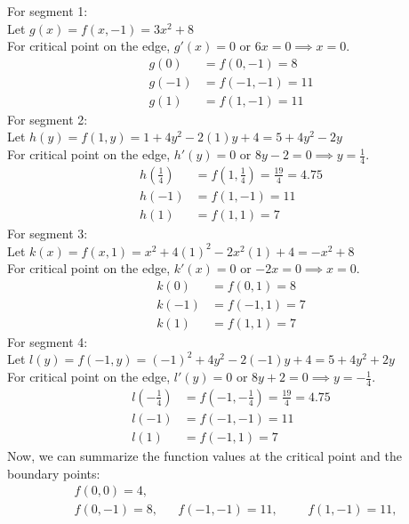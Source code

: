 {    For segment 1: \\
    Let $g(x)=f(x,-1)=3x^2+8$ \\
    For critical point on the edge, $g'(x)=0$ or $6x=0 \implies x=0$. \\
    \begin{align*}
        g(0) &= f(0,-1) = 8 \\
        g(-1) &= f(-1,-1) = 11 \\ 
        g(1) &= f(1,-1) = 11
    \end{align*}
    For segment 2: \\
    Let $h(y)=f(1,y)=1+4y^2-2(1)y+4=5+4y^2-2y$ \\ 
    For critical point on the edge, $h'(y)=0$ or $8y-2=0 \implies y=\frac{1}{4}$. \\ 
    \begin{align*}
        h\left(\frac{1}{4}\right) &= f(1,\frac{1}{4}) = \frac{19}{4} = 4.75 \\
        h(-1) &= f(1,-1) = 11 \\ 
        h(1) &= f(1,1) = 7
    \end{align*}
    For segment 3: \\ 
    Let $k(x)=f(x,1)=x^2+4(1)^2-2x^2(1)+4=-x^2+8$ \\ 
    For critical point on the edge, $k'(x)=0$ or $-2x=0 \implies x=0$. \\ 
    \begin{align*}
        k(0) &= f(0,1) = 8 \\
        k(-1) &= f(-1,1) = 7 \\ 
        k(1) &= f(1,1) = 7
    \end{align*}
    For segment 4: \\ 
    Let $l(y)=f(-1,y)=(-1)^2+4y^2-2(-1)y+4=5+4y^2+2y$ \\ 
    For critical point on the edge, $l'(y)=0$ or $8y+2=0 \implies y=-\frac{1}{4}$. \\ 
    \begin{align*}
        l\left(-\frac{1}{4}\right) &= f(-1,-\frac{1}{4}) = \frac{19}{4} = 4.75 \\
        l(-1) &= f(-1,-1) = 11 \\ 
        l(1) &= f(-1,1) = 7
    \end{align*}
    Now, we can summarize the function values at the critical point and the boundary points:
    \begin{align*}
        & f(0,0) = 4, \\ 
        & f(0,-1) = 8,      && f(-1,-1) = 11,       &&& f(1,-1) = 11, \\ 

\end{align*}}
